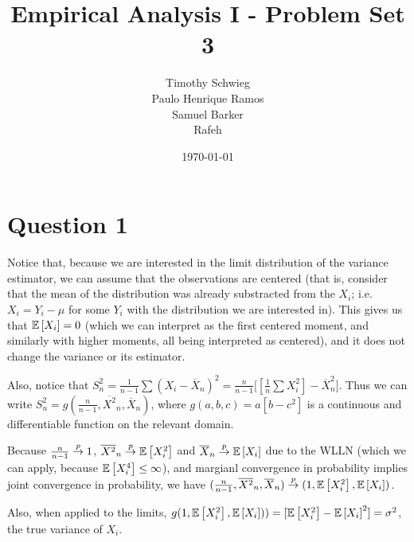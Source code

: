 \documentclass[12pt]{paper}
\begin{document}
\author{
{Timothy Schwieg}\\
{Paulo Henrique Ramos}\\
{Samuel Barker}\\
{Rafeh}
}

\date{\today}
\title{Empirical Analysis I -  Problem Set 3}


\maketitle

\section*{Question 1}

Notice that, because we are interested in the limit distribution of the variance estimator, we can assume that the observations are centered (that is, consider that the mean of the distribution was already substracted from the $X_i$; i.e. $X_i=Y_i-\mu$ for some $Y_i$ with the distribution we are interested in). This gives us that $\mathbb{E} \left [ X_i \right ]=0$ (which we can interpret as the first centered moment, and similarly with higher moments, all being interpreted as centered), and it does not change the variance or its estimator.

Also, notice that $S_n^2=\frac{1}{n-1}\sum{(X_i-\overline{X}_n)^2}=\frac{n}{n-1}\Big[[\frac{1}{n}\sum{X_i^2}]-\overline{X}_n^2\Big]$. Thus we can write $S_n^2=g(\frac{n}{n-1},\overline{X^2}_n,\overline{X}_n)$, where $g(a,b,c)=a[b-c^2]$ is a continuous and differentiable function on the relevant domain.

 Because $\frac{n}{n-1}\overset{p}{\to} 1$, $\overline{X^2}_n\overset{p}{\to} \mathbb{E} \left [ X_i^2 \right ]$ and $\overline{X}_n\overset{p}{\to} \mathbb{E} \left [ X_i \right ]$ due to the WLLN (which we can apply, because $\mathbb{E} \left [ X_i^4 \right ]\le \infty$), and margianl convergence in probability implies joint convergence in probability, we have $(\frac{n}{n-1},\overline{X^2}_n,\overline{X}_n)\overset{p}{\to} (1,\mathbb{E} \left [ X_i^2 \right ],\mathbb{E} \left [ X_i \right ])$.
 
 Also, when applied to the limits, $g(1,\mathbb{E} \left [ X_i^2 \right ],\mathbb{E} \left [ X_i \right ]))=[\mathbb{E} \left [ X_i^2 \right ]-\mathbb{E} \left [ X_i \right ]^2]=\sigma^2$, the true variance of $X_i$.
 
\end{document}
